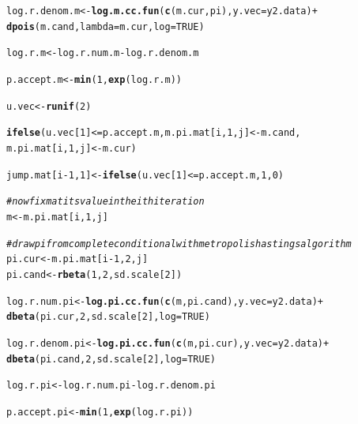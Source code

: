 \documentclass[12pt]{article}\usepackage[]{graphicx}\usepackage[]{color}
\makeatletter
\newcommand{\hlnum}[1]{\textcolor[rgb]{0.686,0.059,0.569}{#1}}%
\newcommand{\hlcom}[1]{\textcolor[rgb]{0.678,0.584,0.686}{\textit{#1}}}%
\newcommand{\hlopt}[1]{\textcolor[rgb]{0,0,0}{#1}}%
\newcommand{\hlstd}[1]{\textcolor[rgb]{0.345,0.345,0.345}{#1}}%
\newcommand{\hlkwb}[1]{\textcolor[rgb]{0.69,0.353,0.396}{#1}}%
\newcommand{\hlkwc}[1]{\textcolor[rgb]{0.333,0.667,0.333}{#1}}%
\newcommand{\hlkwd}[1]{\textcolor[rgb]{0.737,0.353,0.396}{\textbf{#1}}}%
\newenvironment{kframe}{%
 \def\at@end@of@kframe{}%
 \ifinner\ifhmode%
  \def\at@end@of@kframe{\end{minipage}}%
  \begin{minipage}{\columnwidth}%
 \fi\fi%
 \def\FrameCommand##1{\hskip\@totalleftmargin \hskip-\fboxsep
 \colorbox{shadecolor}{##1}\hskip-\fboxsep
     \hskip-\linewidth \hskip-\@totalleftmargin \hskip\columnwidth}%
 \MakeFramed {\advance\hsize-\width
   \@totalleftmargin\z@ \linewidth\hsize
   \@setminipage}}%
 {\par\unskip\endMakeFramed%
 \at@end@of@kframe}
\newenvironment{knitrout}{}{} %
\makeatother
\begin{document}
\begin{enumerate}
\begin{enumerate}
\begin{enumerate}
\begin{knitrout}
\begin{kframe}
\begin{alltt}
    \hlstd{log.r.denom.m} \hlkwb{<-} \hlkwd{log.m.cc.fun}\hlstd{(}\hlkwd{c}\hlstd{(m.cur, pi),} \hlkwc{y.vec} \hlstd{= y2.data)} \hlopt{+}
                       \hlkwd{dpois}\hlstd{(m.cand,} \hlkwc{lambda}\hlstd{=m.cur,} \hlkwc{log} \hlstd{=} \hlnum{TRUE}\hlstd{)}

    \hlstd{log.r.m} \hlkwb{<-} \hlstd{log.r.num.m} \hlopt{-} \hlstd{log.r.denom.m}

    \hlstd{p.accept.m} \hlkwb{<-} \hlkwd{min}\hlstd{(}\hlnum{1}\hlstd{,} \hlkwd{exp}\hlstd{(log.r.m))}

    \hlstd{u.vec} \hlkwb{<-} \hlkwd{runif}\hlstd{(}\hlnum{2}\hlstd{)}

    \hlkwd{ifelse}\hlstd{(u.vec[}\hlnum{1}\hlstd{]} \hlopt{<=} \hlstd{p.accept.m, m.pi.mat[i,} \hlnum{1}\hlstd{, j]} \hlkwb{<-} \hlstd{m.cand,}
           \hlstd{m.pi.mat[i,} \hlnum{1}\hlstd{, j]} \hlkwb{<-} \hlstd{m.cur)}

    \hlstd{jump.mat[i}\hlopt{-}\hlnum{1}\hlstd{,} \hlnum{1}\hlstd{]} \hlkwb{<-} \hlkwd{ifelse}\hlstd{(u.vec[}\hlnum{1}\hlstd{]} \hlopt{<=} \hlstd{p.accept.m,} \hlnum{1}\hlstd{,} \hlnum{0}\hlstd{)}

    \hlcom{#now fix m at its value in the ith iteration}
    \hlstd{m} \hlkwb{<-} \hlstd{m.pi.mat[i,} \hlnum{1}\hlstd{, j]}

    \hlcom{#draw pi from complete conditional with metropolis hastings algorithm}
    \hlstd{pi.cur} \hlkwb{<-} \hlstd{m.pi.mat[i}\hlopt{-}\hlnum{1}\hlstd{,} \hlnum{2}\hlstd{, j]}
    \hlstd{pi.cand} \hlkwb{<-} \hlkwd{rbeta}\hlstd{(}\hlnum{1}\hlstd{,} \hlnum{2}\hlstd{, sd.scale[}\hlnum{2}\hlstd{])}

    \hlstd{log.r.num.pi} \hlkwb{<-} \hlkwd{log.pi.cc.fun}\hlstd{(}\hlkwd{c}\hlstd{(m, pi.cand),} \hlkwc{y.vec} \hlstd{= y2.data)} \hlopt{+}
                     \hlkwd{dbeta}\hlstd{(pi.cur,} \hlnum{2}\hlstd{, sd.scale[}\hlnum{2}\hlstd{],} \hlkwc{log} \hlstd{=} \hlnum{TRUE}\hlstd{)}

    \hlstd{log.r.denom.pi} \hlkwb{<-} \hlkwd{log.pi.cc.fun}\hlstd{(}\hlkwd{c}\hlstd{(m, pi.cur),} \hlkwc{y.vec} \hlstd{= y2.data)} \hlopt{+}
                       \hlkwd{dbeta}\hlstd{(pi.cand,} \hlnum{2}\hlstd{, sd.scale[}\hlnum{2}\hlstd{],} \hlkwc{log} \hlstd{=} \hlnum{TRUE}\hlstd{)}

    \hlstd{log.r.pi} \hlkwb{<-} \hlstd{log.r.num.pi} \hlopt{-} \hlstd{log.r.denom.pi}

    \hlstd{p.accept.pi} \hlkwb{<-} \hlkwd{min}\hlstd{(}\hlnum{1}\hlstd{,} \hlkwd{exp}\hlstd{(log.r.pi))}


\end{alltt}
\end{kframe}
\end{knitrout}
\end{enumerate}
\end{enumerate}
\end{enumerate}
\end{document}
